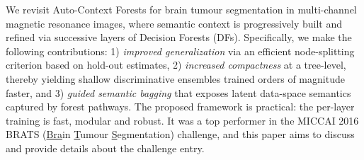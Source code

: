 
We revisit Auto-Context Forests for brain tumour segmentation in multi-channel magnetic resonance images, 
where semantic context is progressively built and refined via successive layers of Decision Forests (DFs). 
Specifically, we make the following contributions: 1) \textit{improved generalization} via an efficient 
node-splitting criterion based on hold-out estimates,
2) \textit{increased compactness} at a tree-level,
thereby yielding shallow discriminative ensembles trained orders of magnitude faster, and 3) 
\textit{guided semantic bagging} that exposes latent data-space semantics captured by forest pathways.
The proposed framework is practical: the per-layer training is fast, modular and robust. It was a top performer in the MICCAI 2016 BRATS (\uline{Bra}in \uline{T}umour \uline{S}egmentation) challenge, and this paper aims to discuss and provide details about the challenge entry.
